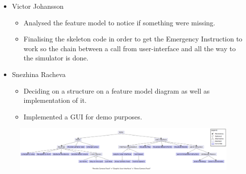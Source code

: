 \begin{itemize}
    \item Victor Johansson
       \begin{itemize}
           \item Analysed the feature model to notice if something were missing.
           \item Finalising the skeleton code in order to get the Emergency Instruction to work so the chain between a call from user-interface and all the way to the simulator is done.
       \end{itemize}
    \item Snezhina Racheva
       \begin{itemize}
           \item Deciding on a structure on a feature model diagram as well as implementation of it.
           \item Implemented a GUI for demo purposes.
       \end{itemize}
\end{itemize}

\begin{figure}
\includegraphics[width=22cm, angle=-90]{docs/assignments/Assignment_4/diagram.png}
\end{figure}